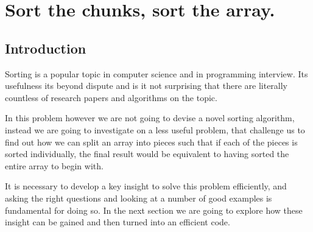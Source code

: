 %



\chapter{Sort the chunks, sort the array.}
\label{ch:max_num_chunks_sorted}
\section*{Introduction}

Sorting is a popular topic in computer science and in programming interview. Its usefulness its beyond dispute and 
is it not surprising that there are literally countless of research papers and algorithms on the topic. 

In this problem however we are not going to devise a novel sorting algorithm, instead 
we are going to investigate on a less useful problem,
that challenge us to find out how we can split an array into pieces such that if each of the pieces is sorted 
individually, the final result would be equivalent to having sorted the entire array to begin with.

It is necessary to develop a key insight to solve this problem efficiently, 
and asking the right questions and looking at a number of good examples
is fundamental for doing so. In the next section we are going to explore how these insight 
can be gained and then turned into an efficient code. 



